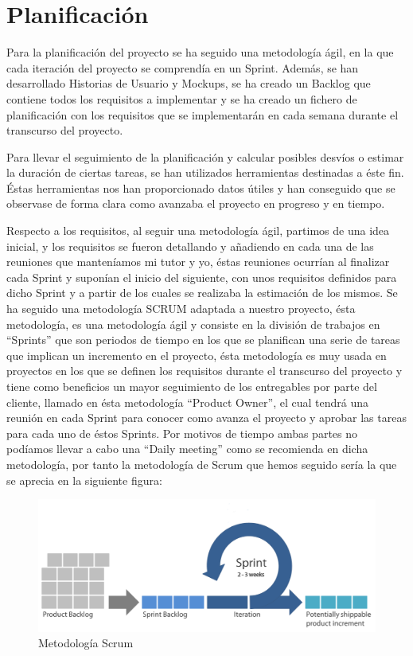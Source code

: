 \documentclass[11pt,openany]{book}
\begin{document}
\chapter{Planificación}

Para la planificación del proyecto se ha seguido una metodología ágil, en la que cada iteración del proyecto se comprendía en un Sprint. Además, se han desarrollado Historias de Usuario y Mockups, se ha creado un Backlog que contiene todos los requisitos a implementar y se ha creado un fichero de planificación con los requisitos que se implementarán en cada semana durante el transcurso del proyecto.

Para llevar el seguimiento de la planificación y calcular posibles desvíos o estimar la duración de ciertas tareas, se han utilizados herramientas destinadas a éste fin. Éstas herramientas nos han proporcionado datos útiles y han conseguido que se observase de forma clara como avanzaba el proyecto en progreso y en tiempo.

Respecto a los requisitos, al seguir una metodología ágil, partimos de una idea inicial, y los requisitos se fueron detallando y añadiendo en cada una de las reuniones que manteníamos mi tutor y yo, éstas reuniones ocurrían al finalizar cada Sprint y suponían el inicio del siguiente, con unos requisitos definidos para dicho Sprint y a partir de los cuales se realizaba la estimación de los mismos. Se ha seguido una metodología SCRUM adaptada a nuestro proyecto, ésta metodología, es una metodología ágil y consiste en la división de trabajos en ``Sprints'' que son periodos de tiempo en los que se planifican una serie de tareas que implican un incremento en el proyecto, ésta metodología es muy usada en proyectos en los que se definen los requisitos durante el transcurso del proyecto y tiene como beneficios un mayor seguimiento de los entregables por parte del cliente, llamado en ésta metodología ``Product Owner'', el cual tendrá una reunión en cada Sprint para conocer como avanza el proyecto y aprobar las tareas para cada uno de éstos Sprints. Por motivos de tiempo ambas partes no podíamos llevar a cabo una ``Daily meeting'' como se recomienda en dicha metodología, por tanto la metodología de Scrum que hemos seguido sería la que se aprecia en la siguiente figura:

\begin{figure}[H]
\includegraphics[totalheight=5cm]{scrum.png}
\caption{Metodología Scrum}
\end{figure}
\par\bigskip 
\noindent
\end{document}
